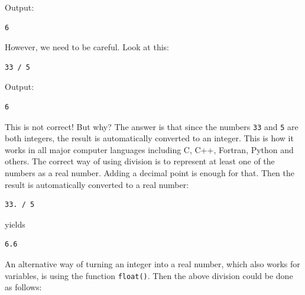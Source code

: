 \documentclass[article,A4,12pt]{llncs}
\begin{document}
\noindent
Output:\\

\begin{ybox}
\begin{verbatim}
6
\end{verbatim}
\end{ybox}
\vspace{6mm}

\noindent
However, we need to be careful. Look at this:\\

\begin{bbox}
\begin{verbatim}
33 / 5
\end{verbatim}
\end{bbox}
\vspace{6mm}

\noindent
Output:\\

\begin{ybox}
\begin{verbatim}
6
\end{verbatim}
\end{ybox}
\vspace{6mm}

\noindent
This is not correct! But why? The answer is that since the numbers {\tt 33} and {\tt 5}
are both integers, the result is automatically converted to an integer. This is how it works 
in all major computer languages including C, C++, Fortran, Python and others. The
correct way of using division is to represent at least one of the numbers as a real number.
Adding a decimal point is enough for that. Then the result is automatically converted 
to a real number:\\

\begin{bbox}
\begin{verbatim}
33. / 5
\end{verbatim}
\end{bbox}
\vspace{6mm}

\noindent
yields\\

\begin{ybox}
\begin{verbatim}
6.6
\end{verbatim}
\end{ybox}
\vspace{6mm}

\noindent
An alternative way of turning an integer into a real number, which 
also works for variables, is using the function {\tt float()}. Then
the above division could be done as follows:\\
\end{document}
